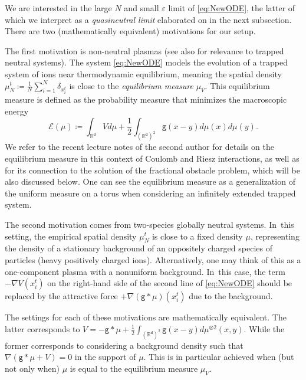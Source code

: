 \documentclass[10pt]{amsart}
\theoremstyle{plain}
\theoremstyle{definition}
\newcommand{\R}{{\mathbb{R}}}
\let\vep\varepsilon
\let\nab\nabla
\renewcommand{\d}{\mathsf{d}}
\newcommand{\g}{{\mathsf{g}}}
\begin{document}
{We are interested in the large $N$ and small $\vep$ limit of \eqref{eq:NewODE}, the latter of which we interpret as a \emph{quasineutral limit} elaborated on in the next subsection. There are two (mathematically equivalent) motivations for our setup.

The first motivation is non-neutral plasmas \cite{OD1998} (see also \cite{WBIP1985,MKTL2008} for relevance to trapped neutral systems). The system \eqref{eq:NewODE} models the evolution of a trapped system of ions near thermodynamic equilibrium, meaning the spatial density $\mu_N^t \coloneqq \frac1N\sum_{i=1}^N\delta_{x_i^t}$ is close to the \emph{equilibrium measure} $\mu_V$. This equilibrium measure is defined as
the probability measure that minimizes the {macroscopic} energy
\begin{equation}\label{eq:Edef}
\mathcal{E}(\mu) \coloneqq \int_{\R^\d}Vd\mu + \frac{1}{2}\int_{(\R^\d)^{ 2}}\g(x-y)d\mu(x) d\mu(y).
\end{equation}
We refer to the recent lecture notes of the second author \cite[Chap.\,2]{SerfatyLN} for details on the equilibrium measure in this context of Coulomb and Riesz interactions, as well as for its connection to the solution of the fractional obstacle problem, which will be also discussed below.
One can see the equilibrium measure as a generalization of the uniform measure on a torus when considering an infinitely extended trapped system.

The second motivation comes from two-species globally neutral systems. In~this setting, the empirical spatial density $\mu_N^t$ is close to a fixed density $\mu$, representing the density of a stationary background of an oppositely charged species of particles (\eg heavy positively charged ions). Alternatively, one may think of this as a one-component plasma with a nonuniform background. In~this case, the term $-\nab V(x_i^t)$ on the right-hand side of the second line of \eqref{eq:NewODE} should be replaced by the attractive force $+\nab(\g\ast\mu)(x_i^t)$ due to the background.

The settings for each of these motivations are mathematically equivalent. The latter corresponds to $V = -\g\ast\mu + \frac12\int_{(\R^\d)^2}\g(x-y)d\mu^{\otimes 2}(x,y)$. While the former corresponds to considering a background density such that $\nabla(\g\ast\mu+V)=0$ in the support of $\mu$. This is in particular achieved when (but not only when) $\mu$ is equal to the equilibrium measure $\mu_V$.
}
\end{document}
